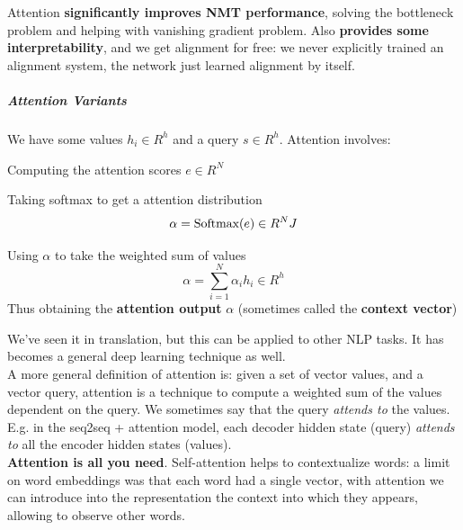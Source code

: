 \documentclass[10pt]{report}
\begin{document}
Attention \textbf{significantly improves NMT performance}, solving the bottleneck problem and helping with vanishing gradient problem. Also \textbf{provides some interpretability}, and we get alignment for free: we never explicitly trained an alignment system, the network just learned alignment by itself.
\subparagraph{Attention Variants} We have some values $h_i\in R^h$ and a query $s\in R^h$. Attention involves:
\begin{list}{}{}
	\item Computing the attention scores $e\in R^N$
	\item Taking softmax to get a attention distribution
	$$\alpha=\hbox{Softmax}(e) \in R^NJ$$
	\item Using $\alpha$ to take the weighted sum of values
	$$\alpha = \sum_{i=1}^N\alpha_ih_i\in R^h$$
	Thus obtaining the \textbf{attention output} $\alpha$ (sometimes called the \textbf{context vector})
\end{list}
We've seen it in translation, but this can be applied to other NLP tasks. It has becomes a general deep learning technique as well.\\
A more general definition of attention is: given a set of vector values, and a vector query, attention is a technique to compute a weighted sum of the values dependent on the query. We sometimes say that the query \textit{attends to} the values. E.g. in the seq2seq + attention model, each decoder hidden state (query) \textit{attends to} all the encoder hidden states (values).\\
\textbf{Attention is all you need}. Self-attention helps to contextualize words: a limit on word embeddings was that each word had a single vector, with attention we can introduce into the representation the context into which they appears, allowing to observe other words.
\end{document}
